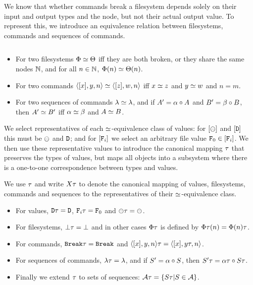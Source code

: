 \bigskip

\noindent
We know that whether commands break a filesystem depends solely on their input and output
types and the node, but not their actual output value.
To represent this, we introduce an equivalence relation between filesystems, commands
and sequences of commands.
\begin{mydef}
$ $ %
\begin{itemize}
\item For two filesystems $\Phi\simeq\Theta$ iff they are both broken, or they share the same nodes $\mathbb{N}$,
and for all $n\in\mathbb{N}$, $\Phi(n) \simeq \Theta(n)$.
\item For two commands $\langle{[x],y,n}\rangle\simeq\langle{[z],w,n}\rangle$ iff 
$x\simeq z$ and $y\simeq w$ and $n=m$.
\item For two sequences of commands $\lambda\simeq\lambda$, and
if $A'=\alpha\circ A$ and $B'=\beta\circ B$, then $A'\simeq B'$ iff $\alpha\simeq\beta$ and $A\simeq B$.
\end{itemize}
\end{mydef}

We select representatives of each $\simeq$-equivalence class of values:
for $[\ominus]$ and $[\mathtt{D}]$ this must be $\ominus$ and $\mathtt{D}$; and
for $[\mathtt{F}_i]$ we select an arbitrary file value $\mathtt{F}_0\in[\mathtt{F}_i]$.
We then use these representative values to
introduce the canonical mapping $\T$ that preserves the types of values,
but maps all objects into a subsystem where there is a one-to-one
correspondence between types and values.

\begin{mydef}[$\T$]
We use $\T$ and write $X\tau$ to denote the canonical mapping of 
values, filesystems, commands and sequences to the
representatives of their $\simeq$-equivalence class.
\begin{itemize}
\item For values, $\mathtt{D}\tau=\mathtt{D}$, $\mathtt{F}_i\tau=\mathtt{F}_0$ and $\ominus\tau=\ominus$.
\item For filesystems, $\bot\tau=\bot$ and in other cases $\Phi\tau$ is defined by $\Phi\tau(n) = \Phi(n)\tau$.
\item For commands, $\mathtt{Break}\tau=\mathtt{Break}$ and $\langle{[x],y,n}\rangle\tau = \langle{[x],{y}\tau,n}\rangle$.
\item For sequences of commands, $\lambda\tau=\lambda$, and if $S'=\alpha\circ S$, then $S'\tau=\alpha\tau\circ S\tau$.
\item Finally we extend $\T$ to sets of sequences: $\mathcal{A}\tau = \{S\tau | S\in\mathcal{A}\}$.
\end{itemize}
\end{mydef}

